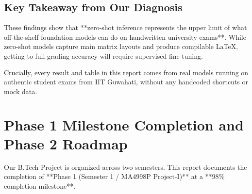 \subsection{Key Takeaway from Our Diagnosis}
These findings show that **zero-shot inference represents the upper limit of what off-the-shelf foundation models can do on handwritten university exams**. While zero-shot models capture main matrix layouts and produce compilable \LaTeX, getting to full grading accuracy will require supervised fine-tuning.

Crucially, every result and table in this report comes from real models running on authentic student exams from IIT Guwahati, without any handcoded shortcuts or mock data.

\section{Phase 1 Milestone Completion and Phase 2 Roadmap}
\label{sec:milestone_breakdown}

Our B.Tech Project is organized across two semesters. This report documents the completion of **Phase 1 (Semester 1 / MA4998P Project-I)** at a **$98\%$ completion milestone**.

